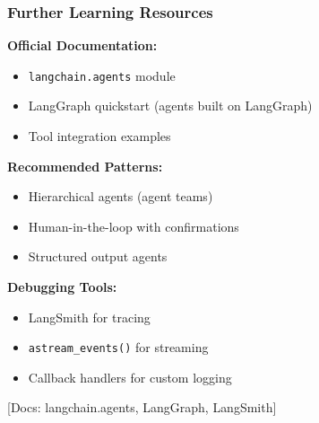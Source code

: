 \documentclass[aspectratio=169,11pt]{beamer}
\newcommand{\docref}[1]{{\scriptsize\color{docgray}[Docs: #1]}}
\begin{document}
\begin{frame}
\frametitle{Further Learning Resources}

\textbf{Official Documentation:}
\begin{itemize}
  \item \texttt{langchain.agents} module
  \item LangGraph quickstart (agents built on LangGraph)
  \item Tool integration examples
\end{itemize}

\vspace{0.3cm}

\textbf{Recommended Patterns:}
\begin{itemize}
  \item Hierarchical agents (agent teams)
  \item Human-in-the-loop with confirmations
  \item Structured output agents
\end{itemize}

\vspace{0.3cm}

\textbf{Debugging Tools:}
\begin{itemize}
  \item LangSmith for tracing
  \item \texttt{astream\_events()} for streaming
  \item Callback handlers for custom logging
\end{itemize}

\vspace{0.3cm}

\docref{langchain.agents, LangGraph, LangSmith}

\end{frame}
\end{document}

